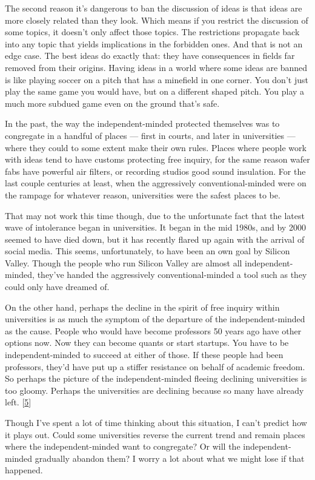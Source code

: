 The second reason it's dangerous to ban the discussion of ideas is that
ideas are more closely related than they look. Which means if you
restrict the discussion of some topics, it doesn't only affect those
topics. The restrictions propagate back into any topic that yields
implications in the forbidden ones. And that is not an edge case. The
best ideas do exactly that: they have consequences in fields far removed
from their origins. Having ideas in a world where some ideas are banned
is like playing soccer on a pitch that has a minefield in one corner.
You don't just play the same game you would have, but on a different
shaped pitch. You play a much more subdued game even on the ground
that's safe.

In the past, the way the independent-minded protected themselves was to
congregate in a handful of places --- first in courts, and later in
universities --- where they could to some extent make their own rules.
Places where people work with ideas tend to have customs protecting free
inquiry, for the same reason wafer fabs have powerful air filters, or
recording studios good sound insulation. For the last couple centuries
at least, when the aggressively conventional-minded were on the rampage
for whatever reason, universities were the safest places to be.

That may not work this time though, due to the unfortunate fact that the
latest wave of intolerance began in universities. It began in the mid
1980s, and by 2000 seemed to have died down, but it has recently flared
up again with the arrival of social media. This seems, unfortunately, to
have been an own goal by Silicon Valley. Though the people who run
Silicon Valley are almost all independent-minded, they've handed the
aggressively conventional-minded a tool such as they could only have
dreamed of.

On the other hand, perhaps the decline in the spirit of free inquiry
within universities is as much the symptom of the departure of the
independent-minded as the cause. People who would have become professors
50 years ago have other options now. Now they can become quants or start
startups. You have to be independent-minded to succeed at either of
those. If these people had been professors, they'd have put up a stiffer
resistance on behalf of academic freedom. So perhaps the picture of the
independent-minded fleeing declining universities is too gloomy. Perhaps
the universities are declining because so many have already left.
{[}\hyperref[f5n]{5}{]}

Though I've spent a lot of time thinking about this situation, I can't
predict how it plays out. Could some universities reverse the current
trend and remain places where the independent-minded want to congregate?
Or will the independent-minded gradually abandon them? I worry a lot
about what we might lose if that happened.

